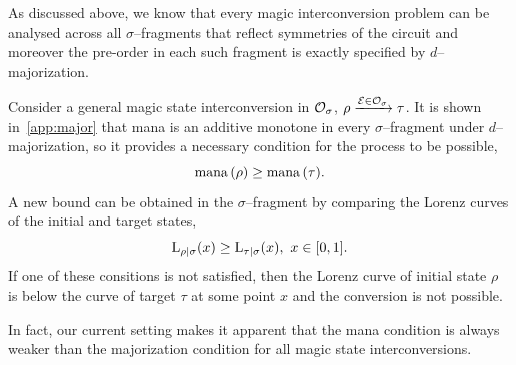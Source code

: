 \documentclass[pra,
aps,
twocolumn,
superscriptaddress,
groupedaddress,
nofootinbib,
reprint
]{revtex4-1}
\begin{document}
As discussed above, we know that every magic interconversion problem can be analysed across all $\sigma$--fragments that reflect symmetries of the circuit and moreover the pre-order in each such fragment is exactly specified by $d$--majorization.

Consider a general magic state interconversion in $\mathcal{O}_\sigma$, $\rho \xrightarrow{\mathcal{E} \in \mathcal{O}_\sigma} \tau$.
It is shown in~\cref{app:major} that mana is an additive monotone in every $\sigma$--fragment under $d$--majorization, so it provides a necessary condition for the process to be possible,
\begin{equation}\label{eq:manabound}
    \mana{\rho} \geq \mana{\tau}. %
\end{equation}
A new bound can be obtained in the $\sigma$--fragment by comparing the Lorenz curves of the initial and target states,
\begin{equation}\label{eq:majbound}
    {{\rm{L}}_{\rho|\sigma}}(x) \geq {{\rm{L}}_{\tau|\sigma}}(x),\ x\in [0,1].
\end{equation}
If one of these consitions is not satisfied, then the Lorenz curve of initial state $\rho$ is below the curve of target $\tau$ at some point $x$ and the conversion is not possible.

In fact, our current setting makes it apparent that the mana condition is always weaker than the majorization condition for all magic state interconversions.
\end{document}
